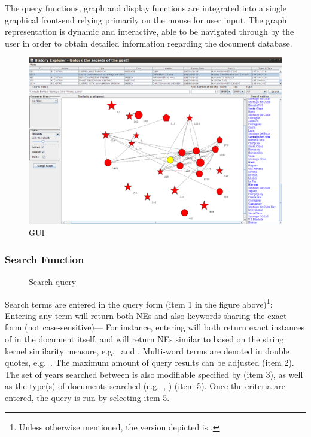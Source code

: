 The query functions, graph and display functions are integrated into a single graphical front-end relying primarily on the mouse for user input. The graph representation is dynamic and interactive, able to be navigated through by the user in order to obtain detailed information regarding the document database.

\begin{figure}[ht]
\centering
\caption{GUI}
\includegraphics[width=160mm]{gui.png}
\end{figure}

\subsubsection{Search Function}
\begin{figure}[ht]
\centering
\caption{Search query}
\end{figure}

Search terms are entered in the query form (item 1 in the figure above)\footnote{Unless otherwise
mentioned, the version depicted is .}: Entering any term will return both NEs and
also keywords sharing the exact form (not case-sensitive)--- For instance, entering
 will both return exact instances of  in the document itself,
and will return NEs similar to  based on the string kernel similarity measure,
e.g.\  and .
Multi-word terms are denoted in double quotes, e.g.\ . The maximum amount
of query results can be adjusted (item 2). The set of years searched between is also modifiable
specified by (item 3), as well as the type(s) of documents searched (e.g.\ ,
) (item 5). Once the criteria are entered, the query is run by selecting item 5.

